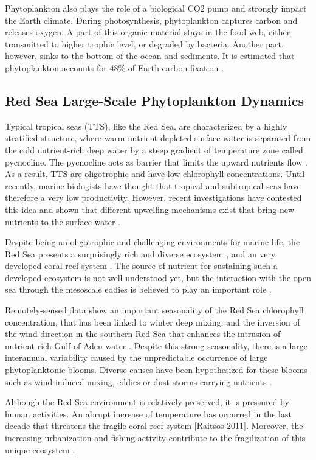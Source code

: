 Phytoplankton also plays the role of a biological CO2 pump and strongly impact the Earth climate. During photosynthesis, phytoplankton captures carbon and releases oxygen. A part of this organic material stays in the food web, either transmitted to higher trophic level, or degraded  by bacteria. Another part, however, sinks to the bottom of the ocean and sediments. It is estimated that phytoplankton accounts for 48\% of Earth carbon fixation \cite{Pal2014}.

\subsection{Red Sea Large-Scale Phytoplankton Dynamics}

Typical tropical seas (TTS), like the Red Sea, are characterized by a highly stratified structure, where warm nutrient-depleted surface water is separated from the cold nutrient-rich deep water by a steep gradient of temperature zone called pycnocline. The pycnocline acts as barrier that limits the upward nutrients flow \cite{Mann2006}. As a result, TTS are oligotrophic and have low chlorophyll concentrations. Until recently, marine biologists have thought that tropical and subtropical seas have therefore a very low productivity. However, recent investigations have contested this idea and shown that different upwelling mechanisms exist that bring new nutrients to the surface water \cite{Mann2006}.

Despite being an oligotrophic and challenging environments for marine life, the Red Sea presents a surprisingly rich and diverse ecosystem \cite{Raitsos2011}, and an very developed coral reef system \cite{Racault}. The source of nutrient for sustaining such a developed ecosystem is not well understood yet, but the interaction with the open sea through the mesoscale eddies is believed to play an important role \cite{Raitsos2013}.

Remotely-sensed data show an important seasonality of the Red Sea chlorophyll concentration, that has been linked to winter deep mixing, and the inversion of the wind direction in the southern Red Sea that enhances the intrusion of nutrient rich Gulf of Aden water \cite{Raitsos2013}. Despite this strong seasonality, there is a large interannual variability caused by the unpredictable occurrence of large phytoplanktonic blooms. Diverse causes have been hypothesized for these blooms such as wind-induced mixing, eddies or dust storms carrying nutrients \cite{Raitsos2013}.

Although the Red Sea environment is relatively preserved, it is pressured by human activities. An abrupt increase of temperature has occurred in the last decade that threatens the fragile coral reef system [Raitsos 2011]. Moreover, the increasing urbanization and fishing activity contribute to the fragilization of this unique ecosystem \cite{Acker2008}.

